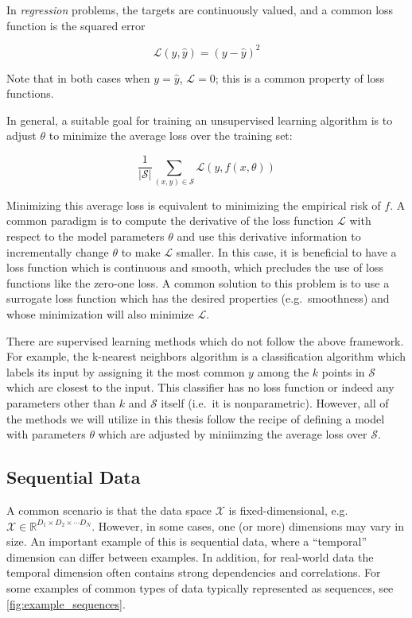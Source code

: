 In {\em regression} problems, the targets are continuously valued, and a common loss function is the squared error

\begin{equation}
\mathcal{L}(y, \hat{y}) = (y - \hat{y})^2
\end{equation}

Note that in both cases when $y = \hat{y}$, $\mathcal{L} = 0$; this is a common property of loss functions.

In general, a suitable goal for training an unsupervised learning algorithm is to adjust $\theta$ to minimize the average loss over the training set:

\begin{equation}
\frac{1}{|\mathcal{S}|} \sum_{(x, y) \in \mathcal{S}} \mathcal{L}(y, f(x, \theta))
\end{equation}

Minimizing this average loss is equivalent to minimizing the empirical risk of $f$.
A common paradigm is to compute the derivative of the loss function $\mathcal{L}$ with respect to the model parameters $\theta$ and use this derivative information to incrementally change $\theta$ to make $\mathcal{L}$ smaller.
In this case, it is beneficial to have a loss function which is continuous and smooth, which precludes the use of loss functions like the zero-one loss.
A common solution to this problem is to use a surrogate loss function which has the desired properties (e.g.\ smoothness) and whose minimization will also minimize $\mathcal{L}$.

There are supervised learning methods which do not follow the above framework.
For example, the k-nearest neighbors algorithm is a classification algorithm which labels its input by assigning it the most common $y$ among the $k$ points in $\mathcal{S}$ which are closest to the input.
This classifier has no loss function or indeed any parameters other than $k$ and $\mathcal{S}$ itself (i.e.\ it is nonparametric).
However, all of the methods we will utilize in this thesis follow the recipe of defining a model with parameters $\theta$ which are adjusted by miniimzing the average loss over $\mathcal{S}$.

\subsection{Sequential Data}

A common scenario is that the data space $\mathcal{X}$ is fixed-dimensional, e.g.\ $\mathcal{X} \in \mathbb{R}^{D_1 \times D_2 \times \cdots D_N}$.
However, in some cases, one (or more) dimensions may vary in size.
An important example of this is sequential data, where a ``temporal'' dimension can differ between examples.
In addition, for real-world data the temporal dimension often contains strong dependencies and correlations.
For some examples of common types of data typically represented as sequences, see \cref{fig:example_sequences}.

